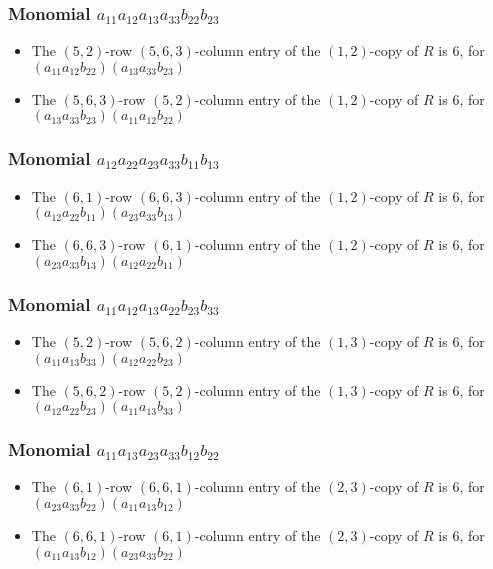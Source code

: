 \documentclass{article}
\begin{document}
\subsubsection{Monomial $ a_{11} a_{12} a_{13} a_{33} b_{22} b_{23} $}

\begin{itemize}
\item The $(5, 2)$-row $(5, 6, 3)$-column entry of the $ \left(1, 2\right) $-copy of $R$ is $ 6 $, for $( a_{11} a_{12} b_{22} )( a_{13} a_{33} b_{23} )$ 
\item The $(5, 6, 3)$-row $(5, 2)$-column entry of the $ \left(1, 2\right) $-copy of $R$ is $ 6 $, for $( a_{13} a_{33} b_{23} )( a_{11} a_{12} b_{22} )$ 
\end{itemize}
\subsubsection{Monomial $ a_{12} a_{22} a_{23} a_{33} b_{11} b_{13} $}

\begin{itemize}
\item The $(6, 1)$-row $(6, 6, 3)$-column entry of the $ \left(1, 2\right) $-copy of $R$ is $ 6 $, for $( a_{12} a_{22} b_{11} )( a_{23} a_{33} b_{13} )$ 
\item The $(6, 6, 3)$-row $(6, 1)$-column entry of the $ \left(1, 2\right) $-copy of $R$ is $ 6 $, for $( a_{23} a_{33} b_{13} )( a_{12} a_{22} b_{11} )$ 
\end{itemize}
\subsubsection{Monomial $ a_{11} a_{12} a_{13} a_{22} b_{23} b_{33} $}

\begin{itemize}
\item The $(5, 2)$-row $(5, 6, 2)$-column entry of the $ \left(1, 3\right) $-copy of $R$ is $ 6 $, for $( a_{11} a_{13} b_{33} )( a_{12} a_{22} b_{23} )$ 
\item The $(5, 6, 2)$-row $(5, 2)$-column entry of the $ \left(1, 3\right) $-copy of $R$ is $ 6 $, for $( a_{12} a_{22} b_{23} )( a_{11} a_{13} b_{33} )$ 
\end{itemize}
\subsubsection{Monomial $ a_{11} a_{13} a_{23} a_{33} b_{12} b_{22} $}

\begin{itemize}
\item The $(6, 1)$-row $(6, 6, 1)$-column entry of the $ \left(2, 3\right) $-copy of $R$ is $ 6 $, for $( a_{23} a_{33} b_{22} )( a_{11} a_{13} b_{12} )$ 
\item The $(6, 6, 1)$-row $(6, 1)$-column entry of the $ \left(2, 3\right) $-copy of $R$ is $ 6 $, for $( a_{11} a_{13} b_{12} )( a_{23} a_{33} b_{22} )$ 
\end{itemize}
\end{document}
